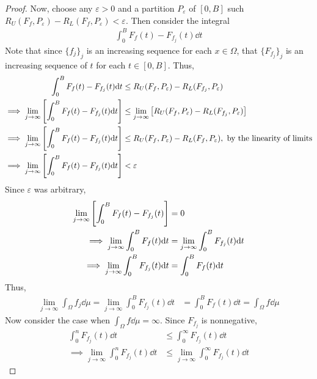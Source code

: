 \documentclass[12pt]{article}
\theoremstyle{plain}
\begin{document}
\begin{proof}
    Now, choose any $\varepsilon > 0$ and a partition $P_\varepsilon$ of $[0, B]$ such $R_U(F_f, P_\varepsilon) - R_L(F_f, P_\varepsilon) < \varepsilon$.  Then consider the integral
    \begin{align*}
        \int_0^B F_f(t) - F_{f_j}(t) \dd t
    \end{align*}
    Note that since $\{f_j\}_j$ is an increasing sequence for each $x \in \Omega$, that $\{F_{f_j}\}_j$ is an increasing sequence of $t$ for each $t \in [0, B]$.  Thus,
    \begin{align*}
        \int_0^B F_f(t) - F_{f_j}(t) \dd t &\leq R_U(F_f, P_\varepsilon) - R_L(F_{f_j}, P_\varepsilon) \\
        \implies \lim_{j \rightarrow \infty} \qty[\int_0^B F_f(t) - F_{f_j}(t) \dd t] &\leq \lim_{j \rightarrow \infty} \qty[R_U(F_f, P_\varepsilon) - R_L(F_{f_j}, P_\varepsilon)] \\
        \implies \lim_{j \rightarrow \infty} \qty[\int_0^B F_f(t) - F_{f_j}(t) \dd t] &\leq R_U(F_f, P_\varepsilon) - R_L(F_f, P_\varepsilon), \ \text{by the linearity of limits} \\
        \implies \lim_{j \rightarrow \infty} \qty[\int_0^B F_f(t) - F_{f_j}(t) \dd t] &< \varepsilon
    \end{align*}
    Since $\varepsilon$ was arbitrary,
    \begin{align*}
        \lim_{j \rightarrow \infty} \qty[\int_0^B F_f(t) - F_{f_j}(t)] &= 0 \\
        \implies \lim_{j\rightarrow \infty}\int_0^B F_f(t) \dd t &= \lim_{j\rightarrow \infty}\int_0^B F_{f_j}(t) \dd t \\
        \implies \lim_{j\rightarrow \infty} \int_0^B F_{f_j}(t) \dd t &= \int_0^B F_f(t) \dd t
    \end{align*}
    Thus,
    \begin{align*}
        \lim_{j\rightarrow \infty} \int_\Omega f_j \dd \mu = \lim_{j\rightarrow \infty} \int_0^B F_{f_j}(t) \dd t &= \int_0^B F_f(t) \dd t = \int_\Omega f\dd \mu
    \end{align*}
    Now consider the case when $\int_\Omega f \dd \mu = \infty$.  Since $F_{f_j}$ is nonnegative,
    \begin{align*}
        \int_0^n F_{f_j}(t) \dd t &\leq \int_0^\infty F_{f_j}(t) \dd t \\
        \implies \lim_{j\rightarrow \infty} \int_0^n F_{f_j}(t) \dd t &\leq \lim_{j\rightarrow \infty} \int_0^\infty F_{f_j}(t) \dd t
    \end{align*}

\end{proof}
\end{document}
